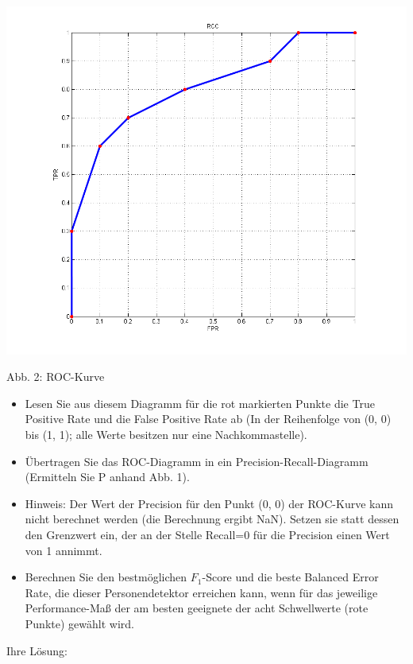 \documentclass[11pt]{article}
\makeatletter
\def\maxwidth{\ifdim\Gin@nat@width>\linewidth\linewidth
    \else\Gin@nat@width\fi}
\let\Oldincludegraphics\includegraphics
\renewcommand{\includegraphics}[1]{\Oldincludegraphics[width=.8\maxwidth]{#1}}
\providecommand{\tightlist}{%
      \setlength{\itemsep}{0pt}\setlength{\parskip}{0pt}}
\makeatother
\begin{document}
\includegraphics{ROC-Curve.png}

Abb. 2: ROC-Kurve

\begin{itemize}
\tightlist
\item
  Lesen Sie aus diesem Diagramm für die rot markierten Punkte die True
  Positive Rate und die False Positive Rate ab (In der Reihenfolge von
  (0, 0) bis (1, 1); alle Werte besitzen nur eine Nachkommastelle).
\item
  Übertragen Sie das ROC-Diagramm in ein Precision-Recall-Diagramm
  (Ermitteln Sie P anhand Abb. 1).
\item
  Hinweis: Der Wert der Precision für den Punkt (0, 0) der ROC-Kurve
  kann nicht berechnet werden (die Berechnung ergibt NaN). Setzen sie
  statt dessen den Grenzwert ein, der an der Stelle Recall=0 für die
  Precision einen Wert von 1 annimmt.
\item
  Berechnen Sie den bestmöglichen \(F_1\)-Score und die beste Balanced
  Error Rate, die dieser Personendetektor erreichen kann, wenn für das
  jeweilige Performance-Maß der am besten geeignete der acht
  Schwellwerte (rote Punkte) gewählt wird.
\end{itemize}

Ihre Lösung:
\end{document}
